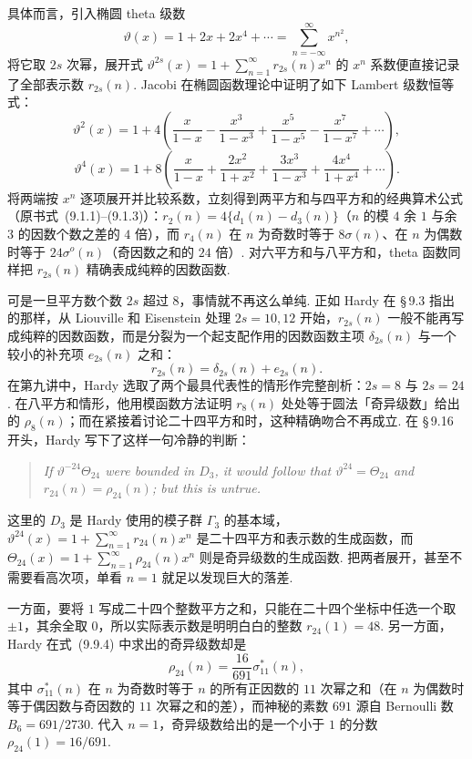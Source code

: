 具体而言，引入椭圆 theta 级数
\begin{equation*}\tag{9.2.1}
\vartheta(x)=1+2x+2x^4+\cdots=\sum_{n=-\infty}^{\infty}x^{n^2},
\end{equation*}
将它取 $2s$ 次幂，展开式 $\vartheta^{2s}(x)=1+\sum_{n=1}^{\infty}r_{2s}(n)x^n$ 的 $x^n$ 系数便直接记录了全部表示数 $r_{2s}(n)$. Jacobi 在椭圆函数理论中证明了如下 Lambert 级数恒等式：
\begin{equation*}\tag{9.2.2}
\vartheta^2(x)=1+4\left(\frac{x}{1-x}-\frac{x^3}{1-x^3}+\frac{x^5}{1-x^5}-\frac{x^7}{1-x^7}+\cdots\right),
\end{equation*}
\begin{equation*}\tag{9.2.3}
\vartheta^4(x)=1+8\left(\frac{x}{1-x}+\frac{2x^2}{1+x^2}+\frac{3x^3}{1-x^3}+\frac{4x^4}{1+x^4}+\cdots\right).
\end{equation*}
将两端按 $x^n$ 逐项展开并比较系数，立刻得到两平方和与四平方和的经典算术公式（原书式~(9.1.1)--(9.1.3)）：$r_2(n)=4\{d_1(n)-d_3(n)\}$（$n$ 的模 $4$ 余 $1$ 与余 $3$ 的因数个数之差的 $4$ 倍），而 $r_4(n)$ 在 $n$ 为奇数时等于 $8\sigma(n)$、在 $n$ 为偶数时等于 $24\sigma^o(n)$（奇因数之和的 $24$ 倍）. 对六平方和与八平方和，theta 函数同样把 $r_{2s}(n)$ 精确表成纯粹的因数函数.

可是一旦平方数个数 $2s$ 超过 $8$，事情就不再这么单纯. 正如 Hardy 在 \S\,9.3 指出的那样，从 Liouville 和 Eisenstein 处理 $2s=10,12$ 开始，$r_{2s}(n)$ 一般不能再写成纯粹的因数函数，而是分裂为一个起支配作用的因数函数主项 $\delta_{2s}(n)$ 与一个较小的补充项 $e_{2s}(n)$ 之和：
\[
r_{2s}(n)=\delta_{2s}(n)+e_{2s}(n).
\]
在第九讲中，Hardy 选取了两个最具代表性的情形作完整剖析：$2s=8$ 与 $2s=24$. 在八平方和情形，他用模函数方法证明 $r_8(n)$ 处处等于圆法「奇异级数」给出的 $\rho_8(n)$；而在紧接着讨论二十四平方和时，这种精确吻合不再成立. 在 \S\,9.16 开头，Hardy 写下了这样一句冷静的判断：
\begin{quote}
\itshape
If $\vartheta^{-24}\Theta_{24}$ were bounded in $D_3$, it would follow that $\vartheta^{24}=\Theta_{24}$ and $r_{24}(n)=\rho_{24}(n)$; but this is untrue.
\end{quote}

这里的 $D_3$ 是 Hardy 使用的模子群 $\Gamma_3$ 的基本域，$\vartheta^{24}(x)=1+\sum_{n=1}^\infty r_{24}(n)x^n$ 是二十四平方和表示数的生成函数，而 $\Theta_{24}(x)=1+\sum_{n=1}^\infty \rho_{24}(n)x^n$ 则是奇异级数的生成函数. 把两者展开，甚至不需要看高次项，单看 $n=1$ 就足以发现巨大的落差.

一方面，要将 $1$ 写成二十四个整数平方之和，只能在二十四个坐标中任选一个取 $\pm 1$，其余全取 $0$，所以实际表示数是明明白白的整数 $r_{24}(1)=48$. 另一方面，Hardy 在式~(9.9.4) 中求出的奇异级数却是
\begin{equation*}\tag{9.9.4}
\rho_{24}(n)=\frac{16}{691}\sigma_{11}^*(n),
\end{equation*}
其中 $\sigma_{11}^*(n)$ 在 $n$ 为奇数时等于 $n$ 的所有正因数的 $11$ 次幂之和（在 $n$ 为偶数时等于偶因数与奇因数的 $11$ 次幂之和的差），而神秘的素数 $691$ 源自 Bernoulli 数 $B_6=691/2730$. 代入 $n=1$，奇异级数给出的是一个小于 $1$ 的分数 $\rho_{24}(1)=16/691$.

